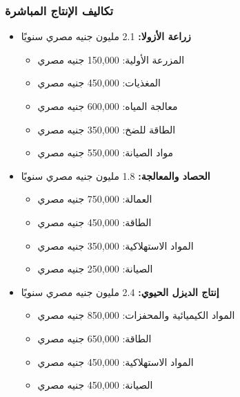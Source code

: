 \subsubsection{تكاليف الإنتاج المباشرة}
\begin{itemize}
    \item \textbf{زراعة الأزولا:} 2.1 مليون جنيه مصري سنويًا
    \begin{itemize}
        \item المزرعة الأولية: 150,000 جنيه مصري
        \item المغذيات: 450,000 جنيه مصري
        \item معالجة المياه: 600,000 جنيه مصري
        \item الطاقة للضخ: 350,000 جنيه مصري
        \item مواد الصيانة: 550,000 جنيه مصري
    \end{itemize}
    
    \item \textbf{الحصاد والمعالجة:} 1.8 مليون جنيه مصري سنويًا
    \begin{itemize}
        \item العمالة: 750,000 جنيه مصري
        \item الطاقة: 450,000 جنيه مصري
        \item المواد الاستهلاكية: 350,000 جنيه مصري
        \item الصيانة: 250,000 جنيه مصري
    \end{itemize}
    
    \item \textbf{إنتاج الديزل الحيوي:} 2.4 مليون جنيه مصري سنويًا
    \begin{itemize}
        \item المواد الكيميائية والمحفزات: 850,000 جنيه مصري
        \item الطاقة: 650,000 جنيه مصري
        \item المواد الاستهلاكية: 450,000 جنيه مصري
        \item الصيانة: 450,000 جنيه مصري
    \end{itemize}
\end{itemize}

